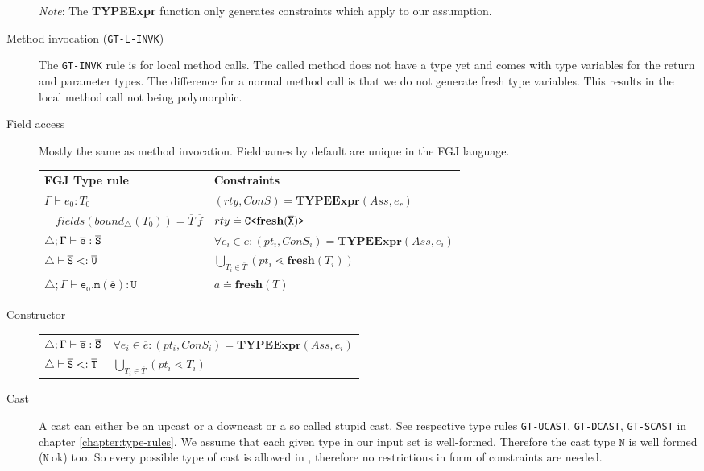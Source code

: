 \documentclass[a4paper,USenglish,cleveref, autoref, thm-restate]{lipics-v2021}
\begin{document}
\begin{description}
\textit{Note}: The \textbf{TYPEExpr} function only generates constraints which apply to our assumption.
\item[Method invocation (\texttt{GT-L-INVK})]
The \texttt{GT-INVK} rule is for local method calls.
The called method does not have a type yet and comes with type variables for the return and parameter types.
The difference for a normal method call is that we do not generate fresh type variables.
This results in the local method call not being polymorphic.


 \item[Field access]
Mostly the same as method invocation.
Fieldnames by default are unique in the FGJ language.

 \begin{tabular}{l|l}
   \textbf{FGJ Type rule} & \textbf{Constraints} \\
   $\Gamma \vdash e_0:T_0$ & $(rty, ConS) = \textbf{TYPEExpr}(Ass, e_r)$\\ 
   $\quad \mathit{fields}(\mathit{bound}_\triangle(T_0)) = \overline{T} \ \overline{f}$ & $rty \doteq \mathtt{C \texttt{<} \textbf{fresh}(\overline{\tt X}) \texttt{>} }$ \\
  $\triangle; \Gamma \vdash \overline{\tt e} : \overline{\tt S}$ & $\forall e_i \in \overline{e} : (pt_i, ConS_i) = \textbf{TYPEExpr}(Ass, e_i)$\\
  $\triangle \vdash \overline{\tt S} <: \overline{\tt U}$ & $ \bigcup_{T_i \in \overline{T}} (pt_i \lessdot \textbf{fresh}(T_i))$\\
  $\triangle; \Gamma \vdash \mathtt{e_0.m(\overline{e}) : U }$ & $a \doteq \textbf{fresh}(T)$ \\
 \end{tabular}
 \item[Constructor]

\begin{tabular}{l|l}
  $\triangle; \Gamma \vdash \overline{\tt e} : \overline{\tt S}$ & $\forall e_i \in \overline{e} : (pt_i, ConS_i) = \textbf{TYPEExpr}(Ass, e_i)$\\
  $\triangle \vdash \overline{\tt S} <: \overline{\tt T}$ & $\bigcup_{T_i \in \overline{T}} (pt_i \lessdot T_i)$
\end{tabular}

\item[Cast]
A cast can either be an upcast or a downcast or a so called stupid cast.
See respective type rules \texttt{GT-UCAST}, \texttt{GT-DCAST}, \texttt{GT-SCAST} in chapter \ref{chapter:type-rules}.
We assume that each given type in our input set is well-formed.
Therefore the cast type $\mathtt{N}$ is well formed ($\mathtt{N}\ \text{ok}$) too.
So every possible type of cast is allowed in \TFGJ, therefore no restrictions in form of constraints are needed.

\end{description}
\end{document}
